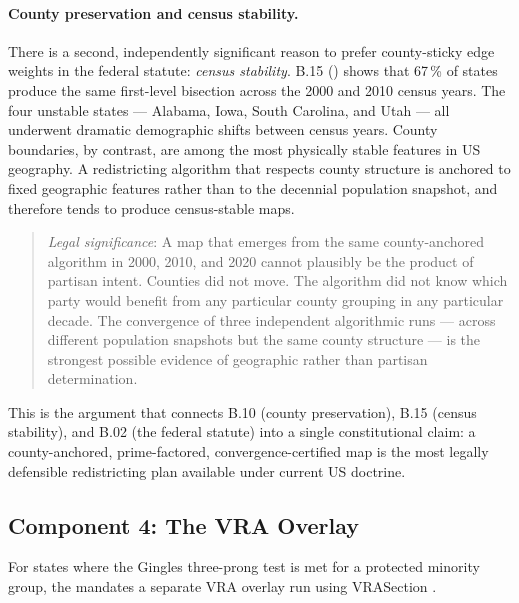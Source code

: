 \paragraph{County preservation and census stability.}
There is a second, independently significant reason to prefer county-sticky
edge weights in the federal statute: \emph{census stability}.
B.15 (\citealt{b15paper}) shows that 67\,\% of states produce the same
first-level bisection across the 2000 and 2010 census years.
The four unstable states --- Alabama, Iowa, South Carolina, and Utah --- all
underwent dramatic demographic shifts between census years.
County boundaries, by contrast, are among the most physically stable
features in US geography.
A redistricting algorithm that respects county structure is anchored to
fixed geographic features rather than to the decennial population snapshot,
and therefore tends to produce census-stable maps.

\begin{quote}
\textit{Legal significance}: A map that emerges from the same county-anchored
algorithm in 2000, 2010, and 2020 cannot plausibly be the product of partisan
intent.
Counties did not move.
The algorithm did not know which party would benefit from any particular
county grouping in any particular decade.
The convergence of three independent algorithmic runs --- across different
population snapshots but the same county structure --- is the strongest
possible evidence of geographic rather than partisan determination.
\end{quote}

This is the argument that connects B.10 (county preservation), B.15 (census
stability), and B.02 (the federal statute) into a single constitutional claim:
a county-anchored, prime-factored, convergence-certified map is the most
legally defensible redistricting plan available under current US doctrine.

\subsection{Component 4: The VRA Overlay}

For states where the Gingles three-prong test is met for a protected minority
group, the \dia{} mandates a separate VRA overlay run using VRASection \citep{b14paper}.

